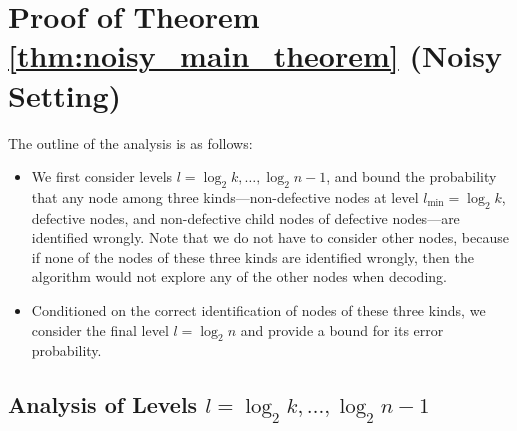 \begin{itemize}
\end{itemize}

\section{Proof of Theorem \ref{thm:noisy_main_theorem} (Noisy Setting)} \label{sec:noisy_algo_analysis}

The outline of the analysis is as follows:
\begin{itemize}
    \item We first consider levels $l=\log_2k,\dots,\log_2n-1$, and bound the probability that any node among three kinds---non-defective nodes at level $l_{\text{min}} = \log_2 k$, defective nodes, and non-defective child nodes of defective nodes---are identified wrongly. Note that we do not have to consider other nodes, because if none of the nodes of these three kinds are identified wrongly, then the algorithm would not explore any of the other nodes when decoding.
    \item Conditioned on the correct identification of nodes of these three kinds, we consider the final level $l=\log_2n$ and provide a bound for its error probability.
\end{itemize}

\subsection{Analysis of Levels $l=\log_2k,\dots,\log_2n-1$}

